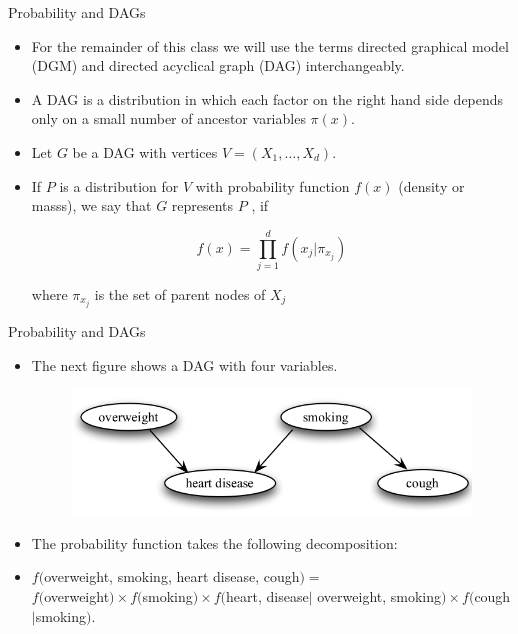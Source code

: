 \documentclass[handout]{beamer}
\begin{document}
\begin{frame}{Probability and DAGs}
\scriptsize{
\begin{itemize}

\item For the remainder of this class we will use the terms   directed graphical model (DGM) and directed acyclical graph (DAG) interchangeably. 

\item A DAG is a distribution in which each factor on the right hand side depends only on a small number of ancestor variables $\pi(x)$. \cite{ermon_kuleshov}



\item Let $G$ be a DAG with vertices $V = (X_1 , \dots , X_d )$. 

\item If $P$ is a distribution for $V$ with probability function $f(x)$ (density or masss), we say that $G$ represents $P$ , if

\begin{displaymath}
 f(x) = \prod_{j=1}^d f(x_j| \pi_{x_j})
\end{displaymath}

where $\pi_{x_j}$ is the set of parent nodes of $X_j$



\end{itemize}



} 

\end{frame}

\begin{frame}{Probability and DAGs}
\scriptsize{
\begin{itemize}


\item The next figure shows a DAG with four variables.

\begin{figure}[h!]
	\centering
	\includegraphics[scale=0.4]{pics/dag3.png}
	\end{figure} 



\item The probability function takes the following decomposition:

\item $f($overweight, smoking, heart disease, cough$) =$ \\    $f($overweight$) \times f($smoking$) \times f($heart, disease$|$ overweight, smoking$) \times f($cough$|$smoking$)$. 


\end{itemize}



} 

\end{frame}
\end{document}
